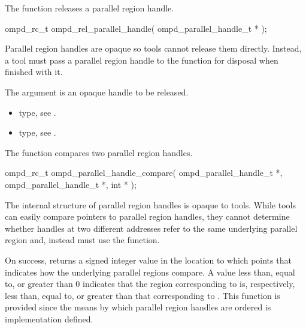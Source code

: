 \label{subsubsubsec:ompd_rel_parallel_handle}
\summary
The  function releases a parallel region handle.

\format
\begin{cspecific}
\begin{ompSyntax}
ompd_rc_t ompd_rel_parallel_handle(
  ompd_parallel_handle_t *
);
\end{ompSyntax}
\end{cspecific}

\descr
Parallel region handles are opaque so tools cannot release them directly. 
Instead, a tool must pass a parallel region handle to the 
 function for disposal when finished with it.

\argdesc
The  argument is an opaque handle to be released.

\crossreferences
\begin{itemize}
\item {} type, 
see .

\item {} type, see .
\end{itemize}



\label{subsubsubsec:ompd_parallel_handle_compare}

\summary
The  function compares two parallel 
region handles.

\format
\begin{cspecific}
\begin{ompSyntax}
ompd_rc_t ompd_parallel_handle_compare(
  ompd_parallel_handle_t *,
  ompd_parallel_handle_t *,
  int *
);
\end{ompSyntax}
\end{cspecific}

\descr
The internal structure of parallel region handles is opaque to tools. While 
tools can easily compare pointers to parallel region handles, they cannot 
determine whether handles at two different addresses refer to the same 
underlying parallel region and, instead must use the 
 function.

On success,  returns a signed integer value 
in the location to which  points that indicates how the underlying 
parallel regions compare. A value less than, equal to, or greater than 0 indicates
that the region corresponding to  is, respectively, less 
than, equal to, or greater than that corresponding to .
This function is provided since the means by which parallel region handles are 
ordered is implementation defined.

